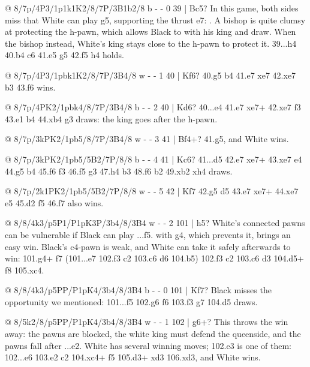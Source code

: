 @ 8/7p/4P3/1p1k1K2/8/7P/3B1b2/8 b - - 0 39 | Bc5?
In this game, both sides miss that White can play \B g5, supporting the thrust e7:
. A bishop is quite clumsy at protecting the
h-pawn, which allows Black to  with his king and draw.
When the bishop  instead, White's king stays close to the h-pawn to protect it.
39...\B h4 40.\B b4 \K c6 41.\K e5 \B g5 42.\K f5 \B h4 holds.

@ 8/7p/4P3/1pbk1K2/8/7P/3B4/8 w - - 1 40 | Kf6?
40.\B g5 b4 41.e7 \B xe7 42.\B xe7 b3 43.\B f6 wins.

@ 8/7p/4PK2/1pbk4/8/7P/3B4/8 b - - 2 40 | Kd6?
40...\K e4 41.e7 \B xe7+ 42.\K xe7 \K f3 43.\B e1 b4 44.\B xb4 \K g3 draws: the king goes
after the h-pawn.

@ 8/7p/3kPK2/1pb5/8/7P/3B4/8 w - - 3 41 | Bf4+?
41.\B g5, and White wins.

@ 8/7p/3kPK2/1pb5/5B2/7P/8/8 b - - 4 41 | Kc6?
41...\K d5 42.e7 \B xe7+ 43.\K xe7 \K e4 44.\B g5 b4 45.\K f6 \K f3 46.\K f5 \K g3 47.h4 b3
48.\B f6 b2 49.\B xb2 \K xh4 draws.

@ 8/7p/2k1PK2/1pb5/5B2/7P/8/8 w - - 5 42 | Kf7
42.\B g5 \K d5 43.e7 \B xe7+ 44.\K xe7 \K e5 45.\B d2 \K f5 46.\K f7 also wins.

@ 8/8/4k3/p5P1/P1pK3P/3b4/8/3B4 w - - 2 101 | h5?
 White's connected pawns can be vulnerable if Black can
play ...\K f5.  with \B g4, which prevents it, brings an easy win.
Black's c4-pawn is weak, and White can take it safely afterwards to win: 101.\B g4+ \K f7
(101...\K e7 102.\B f3 \B c2 103.\B c6 \K d6 104.\B b5) 102.\B f3 \B c2 103.\B c6 \B d3
104.\B d5+ \K f8 105.\B xc4.

@ 8/8/4k3/p5PP/P1pK4/3b4/8/3B4 b - - 0 101 | Kf7?
Black misses the opportunity we mentioned: 101...\K f5 102.g6 \K f6 103.\B f3 \K g7 104.\B d5
draws.

@ 8/5k2/8/p5PP/P1pK4/3b4/8/3B4 w - - 1 102 | g6+?
This throws the win away: the pawns are blocked, the white king must defend the queenside, and the
pawns fall after ...\B e2. White has several winning moves; 102.\K e3 is one of them: 102...\K e6
103.\B e2 \B c2 104.\B xc4+ \K f5 105.\B d3+ \B xd3 106.\K xd3, and White wins.

